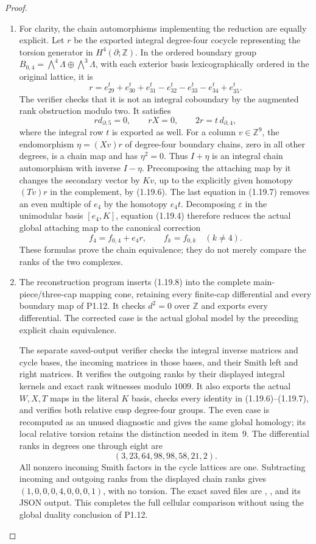 \begin{proof}
\begin{enumerate}[label=\arabic*.]
\item For clarity, the chain automorphisms implementing the reduction
are equally explicit.  Let $r$ be the exported integral degree-four
cocycle representing the torsion generator in $H^4(\partial;\mathbb Z)$.
In the ordered boundary group
$B_{0,4}=\bigwedge^4\Lambda\oplus\bigwedge^3\Lambda$, with each
exterior basis lexicographically ordered in the original lattice,
it is
\[
r=e_{29}^{t}+e_{30}^{t}+e_{31}^{t}
  -e_{32}^{t}-e_{33}^{t}-e_{34}^{t}+e_{35}^{t}.
\]
The verifier checks that it is not an integral coboundary by the
augmented rank obstruction modulo two.  It satisfies
\[
 r d_{\partial,5}=0,\qquad rX=0,
 \qquad 2r=t\,d_{\partial,4},
\tag{1.19.7}
\]
where the integral row $t$ is exported as well.
For a column $v\in\mathbb Z^9$, the endomorphism
$\eta=(Xv)r$ of degree-four boundary chains, zero in all other
degrees, is a chain map and has $\eta^2=0$.
Thus $I+\eta$ is an integral chain automorphism with inverse
$I-\eta$. Precomposing the attaching map by it changes the
secondary vector by $Kv$, up to the explicitly given homotopy
$(Tv)r$ in the complement, by (1.19.6).
The last equation in (1.19.7) removes an even multiple of $e_4$
by the homotopy $e_4t$.  Decomposing $\varepsilon$ in the
unimodular basis $[e_4,K]$, equation (1.19.4) therefore reduces
the actual global attaching map to the canonical correction
\[
 f_4=f_{0,4}+e_4r,
 \qquad f_k=f_{0,k}\quad(k\ne4).
\tag{1.19.8}
\]
These formulas prove the chain equivalence; they do not merely
compare the ranks of the two complexes.

\item The reconstruction program inserts (1.19.8) into the complete
main-piece/three-cap mapping cone, retaining every finite-cap
differential and every boundary map of P1.12.  It checks $d^2=0$
over $\mathbb Z$ and exports every differential.  The corrected case
is the actual global model by the preceding explicit chain
equivalence.

The separate saved-output verifier checks the integral inverse
matrices and cycle bases, the incoming matrices in those bases, and
their Smith left and right matrices.  It verifies the outgoing ranks
by their displayed integral kernels and exact rank witnesses modulo
$1009$.  It also exports the actual $W,X,T$ maps in the literal $K$
basis, checks every identity in (1.19.6)--(1.19.7), and verifies both
relative cusp degree-four groups.  The even case is recomputed as
an unused diagnostic and gives the same global homology; its local
relative torsion retains the distinction needed in item~9.
The differential ranks in degrees one through eight are
\[
                 (3,23,64,98,98,58,21,2).
\]
All nonzero incoming Smith factors in the cycle lattices are one.
Subtracting incoming and outgoing ranks from the displayed chain
ranks gives $(1,0,0,0,4,0,0,0,1)$, with no torsion.
The exact saved files are
,
,
and its JSON output.  This completes the full cellular comparison
without using the global duality conclusion of P1.12.


\end{enumerate}
\end{proof}
